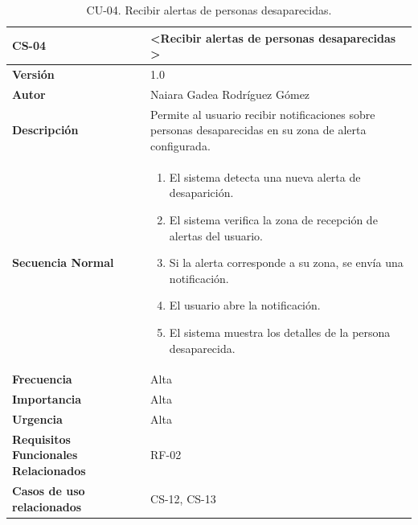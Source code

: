 \begin{table}[htbp] %
\centering
\begin{tabular}{ |m{3cm}|m{11cm}|  } 
\hline
\cellcolor[HTML]{B9E3F0}\centering\textbf{CS-04} & \cellcolor[HTML]{B9E3F0}\textbf{\textless Recibir alertas de personas desaparecidas \textgreater}\\

\hline
\cellcolor[HTML]{EFEFEF}\textbf{Versión}             & 1.0  \\
\hline
\cellcolor[HTML]{EFEFEF}\textbf{Autor}                & Naiara Gadea Rodríguez Gómez\\
\hline
\cellcolor[HTML]{EFEFEF}\textbf{Descripción}                & { Permite al usuario recibir notificaciones sobre personas desaparecidas en su zona de alerta configurada. }\\
\hline
\cellcolor[HTML]{EFEFEF}\textbf{Secuencia \newline Normal}                &                 
        \begin{enumerate}
            \item El sistema detecta una nueva alerta de desaparición.
            \item El sistema verifica la zona de recepción de alertas del usuario.
            \item Si la alerta corresponde a su zona, se envía una notificación.
            \item El usuario abre la notificación.
            \item El sistema muestra los detalles de la persona desaparecida.
        \end{enumerate}\\
\hline
\cellcolor[HTML]{EFEFEF}\textbf{Frecuencia}                & Alta\\
\hline
\cellcolor[HTML]{EFEFEF}\textbf{Importancia}                & Alta\\
\hline
\cellcolor[HTML]{EFEFEF}\textbf{Urgencia}                & Alta\\
\hline
\cellcolor[HTML]{EFEFEF}\textbf{Requisitos Funcionales Relacionados}                & { RF-02 }\\
\hline
\cellcolor[HTML]{EFEFEF}\textbf{Casos de uso relacionados}                & { CS-12, CS-13 }\\
\hline
\end{tabular}
\caption{CU-04. Recibir alertas de personas desaparecidas.}
\end{table}



